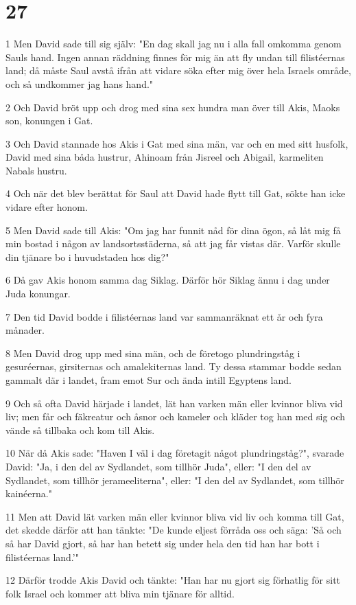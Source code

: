 \chapter{27}

\par 1 Men David sade till sig själv: "En dag skall jag nu i alla fall omkomma genom Sauls hand. Ingen annan räddning finnes för mig än att fly undan till filistéernas land; då måste Saul avstå ifrån att vidare söka efter mig över hela Israels område, och så undkommer jag hans hand."
\par 2 Och David bröt upp och drog med sina sex hundra man över till Akis, Maoks son, konungen i Gat.
\par 3 Och David stannade hos Akis i Gat med sina män, var och en med sitt husfolk, David med sina båda hustrur, Ahinoam från Jisreel och Abigail, karmeliten Nabals hustru.
\par 4 Och när det blev berättat för Saul att David hade flytt till Gat, sökte han icke vidare efter honom.
\par 5 Men David sade till Akis: "Om jag har funnit nåd för dina ögon, så låt mig få min bostad i någon av landsortsstäderna, så att jag får vistas där. Varför skulle din tjänare bo i huvudstaden hos dig?"
\par 6 Då gav Akis honom samma dag Siklag. Därför hör Siklag ännu i dag under Juda konungar.
\par 7 Den tid David bodde i filistéernas land var sammanräknat ett år och fyra månader.
\par 8 Men David drog upp med sina män, och de företogo plundringståg i gesuréernas, girsiternas och amalekiternas land. Ty dessa stammar bodde sedan gammalt där i landet, fram emot Sur och ända intill Egyptens land.
\par 9 Och så ofta David härjade i landet, lät han varken män eller kvinnor bliva vid liv; men får och fäkreatur och åsnor och kameler och kläder tog han med sig och vände så tillbaka och kom till Akis.
\par 10 När då Akis sade: "Haven I väl i dag företagit något plundringståg?", svarade David: "Ja, i den del av Sydlandet, som tillhör Juda", eller: "I den del av Sydlandet, som tillhör jerameeliterna", eller: "I den del av Sydlandet, som tillhör kainéerna."
\par 11 Men att David lät varken män eller kvinnor bliva vid liv och komma till Gat, det skedde därför att han tänkte: "De kunde eljest förråda oss och säga: 'Så och så har David gjort, så har han betett sig under hela den tid han har bott i filistéernas land.'"
\par 12 Därför trodde Akis David och tänkte: "Han har nu gjort sig förhatlig för sitt folk Israel och kommer att bliva min tjänare för alltid.

